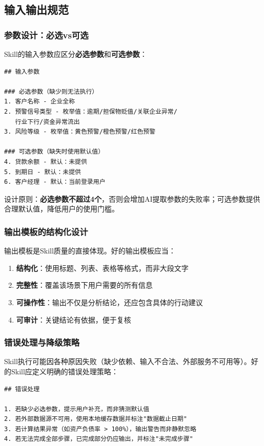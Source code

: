 \subsection{输入输出规范}

\subsubsection{参数设计：必选vs可选}

Skill的输入参数应区分\textbf{必选参数}和\textbf{可选参数}：

\begin{lstlisting}
## 输入参数

### 必选参数（缺少则无法执行）
1. 客户名称 - 企业全称
2. 预警信号类型 - 枚举值：逾期/担保物贬值/关联企业异常/
   行业下行/资金异常流出
3. 风险等级 - 枚举值：黄色预警/橙色预警/红色预警

### 可选参数（缺失时使用默认值）
4. 贷款余额 - 默认：未提供
5. 到期日 - 默认：未提供
6. 客户经理 - 默认：当前登录用户
\end{lstlisting}

设计原则：\textbf{必选参数不超过4个}，否则会增加AI提取参数的失败率；可选参数提供合理默认值，降低用户的使用门槛。

\subsubsection{输出模板的结构化设计}

输出模板是Skill质量的直接体现。好的输出模板应当：
\begin{enumerate}[leftmargin=2em]
  \item \textbf{结构化}：使用标题、列表、表格等格式，而非大段文字
  \item \textbf{完整性}：覆盖该场景下用户需要的所有信息
  \item \textbf{可操作性}：输出不仅是分析结论，还应包含具体的行动建议
  \item \textbf{可审计}：关键结论有依据，便于复核
\end{enumerate}

\subsubsection{错误处理与降级策略}

Skill执行可能因各种原因失败（缺少依赖、输入不合法、外部服务不可用等）。好的Skill应定义明确的错误处理策略：

\begin{lstlisting}
## 错误处理

1. 若缺少必选参数，提示用户补充，而非猜测默认值
2. 若外部数据源不可用，使用本地缓存数据并标注"数据截止日期"
3. 若计算结果异常（如资产负债率 > 100%），输出警告而非静默忽略
4. 若无法完成全部步骤，已完成部分仍应输出，并标注"未完成步骤"
\end{lstlisting}

